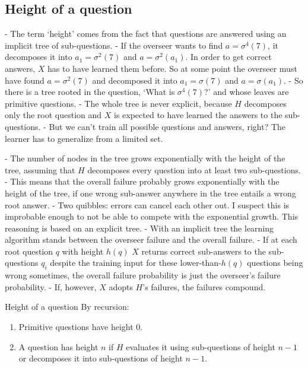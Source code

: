 \documentclass{farlamp}
\begin{document}
\subsection{Height of a question}

- The term ‘height’ comes from the fact that questions are answered using an
implicit tree of sub-questions.
- If the overseer wants to find $a = \sigma^4(7)$, it decomposes it into $a_1 =
\sigma^2(7)$ and $a = \sigma^2(a_1)$. In order to get correct answers, $X$ has
to have learned them before. So at some point the overseer must have found $a =
\sigma^2(7)$ and decomposed it into $a_1 = \sigma(7)$ and $a = \sigma(a_1)$.
- So there is a tree rooted in the question, ‘What is $\sigma^4(7)$?’ and whose
leaves are primitive questions.
- The whole tree is never explicit, because $H$ decomposes only the root
question and $X$ is expected to have learned the answers to the sub-questions.
- But we can't train all possible questions and answers, right? The learner has
to generalize from a limited set.

- The number of nodes in the tree grows exponentially with the height of the
tree, assuming that $H$ decomposes every question into at least two
sub-questions.
- This means that the overall failure probably grows exponentially with the
height of the tree, if one wrong sub-answer anywhere in the tree entails a wrong
root answer.
- Two quibbles: errors can cancel each other out. I suspect this is improbable
enough to not be able to compete with the exponential growth. This reasoning is
based on an explicit tree.
- With an implicit tree the learning algorithm stands between the overseer
failure and the overall failure.
- If at each root question $q$ with height $h(q)$ $X$ returns correct
sub-answers to the sub-questions $q_i$ despite the training input for these
lower-than-$h(q)$ questions being wrong sometimes, the overall failure
probability is just the overseer's failure probability.
- If, however, $X$ adopts $H$'s failures, the failures compound.

\begin{def}{Height of a question} By recursion:
    \begin{enumerate}
    \item Primitive questions have height 0.
    \item A question has height $n$ if $H$ evaluates it using sub-questions of
        height $n-1$ or decomposes it into sub-questions of height $n-1$.
    \end{enumerate}
\end{def}
\end{document}
